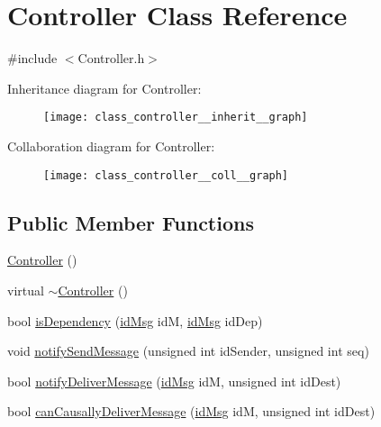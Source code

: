 \hypertarget{class_controller}{}\section{Controller Class Reference}
\label{class_controller}


{\ttfamily \#include $<$Controller.\+h$>$}



Inheritance diagram for Controller\+:\nopagebreak
\begin{figure}[H]
\begin{center}
\leavevmode
\texttt{[image: class\_controller\_\_inherit\_\_graph]}
\end{center}
\end{figure}


Collaboration diagram for Controller\+:\nopagebreak
\begin{figure}[H]
\begin{center}
\leavevmode
\texttt{[image: class\_controller\_\_coll\_\_graph]}
\end{center}
\end{figure}
\subsection*{Public Member Functions}
\begin{DoxyCompactItemize}
\item 
\hyperlink{class_controller_a95c56822d667e94b031451729ce069a9}{Controller} ()
\item 
virtual \hyperlink{class_controller_a0ab87934c4f7a266cfdb86e0f36bc1b5}{$\sim$\+Controller} ()
\item 
bool \hyperlink{class_controller_ad76a99df69bf99705dc18ba72b4b04c2}{is\+Dependency} (\hyperlink{structures_8h_a83a1d9a070efa5341da84cfd8e28d3e5}{id\+Msg} idM, \hyperlink{structures_8h_a83a1d9a070efa5341da84cfd8e28d3e5}{id\+Msg} id\+Dep)
\item 
void \hyperlink{class_controller_a7207304a07534e50a690f26c765b4a71}{notify\+Send\+Message} (unsigned int id\+Sender, unsigned int seq)
\item 
bool \hyperlink{class_controller_a8905abf1976e737410ac0142001e38a0}{notify\+Deliver\+Message} (\hyperlink{structures_8h_a83a1d9a070efa5341da84cfd8e28d3e5}{id\+Msg} idM, unsigned int id\+Dest)
\item 
bool \hyperlink{class_controller_ab57c4459f002be63b4deda1d7c3c3e29}{can\+Causally\+Deliver\+Message} (\hyperlink{structures_8h_a83a1d9a070efa5341da84cfd8e28d3e5}{id\+Msg} idM, unsigned int id\+Dest)
\end{DoxyCompactItemize}
